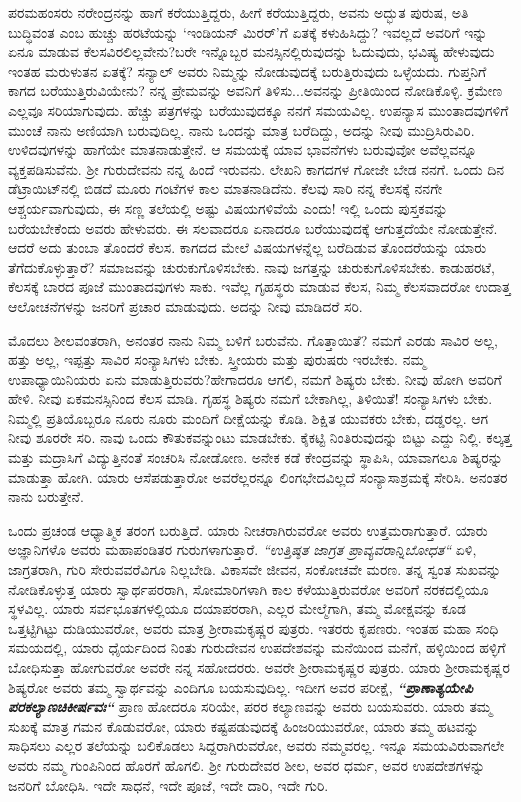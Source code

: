 ಪರಮಹಂಸರು ನರೇಂದ್ರನನ್ನು ಹಾಗೆ ಕರೆಯುತ್ತಿದ್ದರು, ಹೀಗೆ ಕರೆಯುತ್ತಿದ್ದರು, ಅವನು ಅದ್ಭುತ ಪುರುಷ, ಅತಿ ಬುದ್ಧಿವಂತ \enginline{-} ಎಂಬ ಹುಚ್ಚು ಹರಟೆಯನ್ನು ‘ಇಂಡಿಯನ್ ಮಿರರ್’ಗೆ ಏತಕ್ಕೆ ಕಳುಹಿಸಿದ್ದು? ಇವಲ್ಲದೆ ಅವರಿಗೆ ಇನ್ನು ಏನೂ ಮಾಡುವ ಕೆಲಸವಿರಲಿಲ್ಲವೇನು?ಬರೇ ಇನ್ನೊಬ್ಬರ ಮನಸ್ಸಿನಲ್ಲಿರುವುದನ್ನು ಓದುವುದು, ಭವಿಷ್ಯ ಹೇಳುವುದು ಇಂತಹ ಮರುಳುತನ ಏತಕ್ಕೆ? ಸನ್ಯಾಲ್ ಅವರು ನಿಮ್ಮನ್ನು ನೋಡುವುದಕ್ಕೆ ಬರುತ್ತಿರುವುದು ಒಳ್ಳೆಯದು. ಗುಪ್ತನಿಗೆ ಕಾಗದ ಬರೆಯುತ್ತಿರುವಿಯೇನು? ನನ್ನ ಪ್ರೇಮವನ್ನು ಅವನಿಗೆ ತಿಳಿಸು...ಅವನನ್ನು ಪ್ರೀತಿಯಿಂದ ನೋಡಿಕೊಳ್ಳಿ. ಕ್ರಮೇಣ ಎಲ್ಲವೂ ಸರಿಯಾಗುವುದು. ಹೆಚ್ಚು ಪತ್ರಗಳನ್ನು ಬರೆಯುವುದಕ್ಕೂ ನನಗೆ ಸಮಯವಿಲ್ಲ. ಉಪನ್ಯಾಸ ಮುಂತಾದವುಗಳಿಗೆ ಮುಂಚೆ ನಾನು ಅಣಿಯಾಗಿ ಬರುವುದಿಲ್ಲ. ನಾನು ಒಂದನ್ನು ಮಾತ್ರ ಬರೆದಿದ್ದು, ಅದನ್ನು ನೀವು ಮುದ್ರಿಸಿರುವಿರಿ. ಉಳಿದವುಗಳನ್ನು ಹಾಗೆಯೇ ಮಾತನಾಡುತ್ತೇನೆ. ಆ ಸಮಯಕ್ಕೆ ಯಾವ ಭಾವನೆಗಳು ಬರುವುವೋ ಅವೆಲ್ಲವನ್ನೂ ವ್ಯಕ್ತಪಡಿಸುವೆನು. ಶ‍್ರೀ ಗುರುದೇವನು ನನ್ನ ಹಿಂದೆ ಇರುವನು. ಲೇಖನಿ ಕಾಗದಗಳ ಗೋಜೇ ಬೇಡ ನನಗೆ. ಒಂದು ದಿನ ಡೆಟ್ರಾಯಿಟ್‌ನಲ್ಲಿ ಬಿಡದೆ ಮೂರು ಗಂಟೆಗಳ ಕಾಲ ಮಾತನಾಡಿದೆನು. ಕೆಲವು ಸಾರಿ ನನ್ನ ಕೆಲಸಕ್ಕೆ ನನಗೇ ಆಶ್ಚರ್ಯವಾಗುವುದು, ಈ ಸಣ್ಣ ತಲೆಯಲ್ಲಿ ಅಷ್ಟು ವಿಷಯಗಳಿವೆಯೆ ಎಂದು! ಇಲ್ಲಿ ಒಂದು ಪುಸ್ತಕವನ್ನು ಬರೆಯಬೇಕೆಂದು ಅವರು ಹೇಳುವರು. ಈ ಸಲವಾದರೂ ಏನಾದರೂ ಬರೆಯುವುದಕ್ಕೆ ಆಗುತ್ತದೆಯೇ ನೋಡುತ್ತೇನೆ. ಆದರೆ ಅದು ತುಂಬಾ ತೊಂದರೆ ಕೆಲಸ. ಕಾಗದದ ಮೇಲೆ ವಿಷಯಗಳನ್ನೆಲ್ಲ ಬರೆದಿಡುವ ತೊಂದರೆಯನ್ನು ಯಾರು ತೆಗೆದುಕೊಳ್ಳುತ್ತಾರೆ? ಸಮಾಜವನ್ನು ಚುರುಕುಗೊಳಿಸಬೇಕು. ನಾವು ಜಗತ್ತನ್ನು ಚುರುಕುಗೊಳಿಸಬೇಕು. ಕಾಡುಹರಟೆ, ಕೆಲಸಕ್ಕೆ ಬಾರದ ಪೂಜೆ ಮುಂತಾದವುಗಳು ಸಾಕು. ಇವೆಲ್ಲ ಗೃಹಸ್ಥರು ಮಾಡುವ ಕೆಲಸ, ನಿಮ್ಮ ಕೆಲಸವಾದರೋ ಉದಾತ್ತ ಆಲೋಚನೆಗಳನ್ನು ಜನರಿಗೆ ಪ್ರಚಾರ ಮಾಡುವುದು. ಅದನ್ನು ನೀವು ಮಾಡಿದರೆ ಸರಿ.

ಮೊದಲು ಶೀಲವಂತರಾಗಿ, ಅನಂತರ ನಾನು ನಿಮ್ಮ ಬಳಿಗೆ ಬರುವೆನು. ಗೊತ್ತಾಯಿತೆ? ನಮಗೆ ಎರಡು ಸಾವಿರ ಅಲ್ಲ, ಹತ್ತು ಅಲ್ಲ, ಇಪ್ಪತ್ತು ಸಾವಿರ ಸಂನ್ಯಾಸಿಗಳು ಬೇಕು. ಸ್ತ್ರೀಯರು ಮತ್ತು ಪುರುಷರು ಇರಬೇಕು. ನಮ್ಮ ಉಪಾಧ್ಯಾಯಿನಿಯರು ಏನು ಮಾಡುತ್ತಿರುವರು?ಹೇಗಾದರೂ ಆಗಲಿ, ನಮಗೆ ಶಿಷ್ಯರು ಬೇಕು. ನೀವು ಹೋಗಿ ಅವರಿಗೆ ಹೇಳಿ. ನೀವು ಏಕಮನಸ್ಸಿನಿಂದ ಕೆಲಸ ಮಾಡಿ. ಗೃಹಸ್ಥ ಶಿಷ್ಯರು ನಮಗೆ ಬೇಕಾಗಿಲ್ಲ, ತಿಳಿಯಿತೆ! ಸಂನ್ಯಾಸಿಗಳು ಬೇಕು. ನಿಮ್ಮಲ್ಲಿ ಪ್ರತಿಯೊಬ್ಬರೂ ನೂರು ನೂರು ಮಂದಿಗೆ ದೀಕ್ಷೆಯನ್ನು ಕೊಡಿ. ಶಿಕ್ಷಿತ ಯುವಕರು ಬೇಕು, ದಡ್ಡರಲ್ಲ. ಆಗ ನೀವು ಶೂರರೇ ಸರಿ. ನಾವು ಒಂದು ಕೌತುಕವನ್ನುಂಟು ಮಾಡಬೇಕು. ಕೈಕಟ್ಟಿ ನಿಂತಿರುವುದನ್ನು ಬಿಟ್ಟು ಎದ್ದು ನಿಲ್ಲಿ. ಕಲ್ಕತ್ತ ಮತ್ತು ಮದ್ರಾಸಿಗೆ ವಿದ್ಯುತ್ತಿನಂತೆ ಸಂಚರಿಸಿ ನೋಡೋಣ. ಅನೇಕ ಕಡೆ ಕೇಂದ್ರವನ್ನು ಸ್ಥಾಪಿಸಿ, ಯಾವಾಗಲೂ ಶಿಷ್ಯರನ್ನು ಮಾಡುತ್ತಾ ಹೋಗಿ. ಯಾರು ಆಸೆಪಡುತ್ತಾರೋ ಅವರೆಲ್ಲರನ್ನೂ ಲಿಂಗಭೇದವಿಲ್ಲದೆ ಸಂನ್ಯಾಸಾಶ್ರಮಕ್ಕೆ ಸೇರಿಸಿ. ಅನಂತರ ನಾನು ಬರುತ್ತೇನೆ.

ಒಂದು ಪ್ರಚಂಡ ಆಧ್ಯಾತ್ಮಿಕ ತರಂಗ ಬರುತ್ತಿದೆ. ಯಾರು ನೀಚರಾಗಿರುವರೋ ಅವರು ಉತ್ತಮರಾಗುತ್ತಾರೆ. ಯಾರು ಅಜ್ಞಾನಿಗಳೊ ಅವರು ಮಹಾಪಂಡಿತರ ಗುರುಗಳಾಗುತ್ತಾರೆ. \textit{“ಉತ್ತಿಷ್ಠತ ಜಾಗ್ರತ ಪ್ರಾವ್ಯವರಾನ್ನಿಬೋಧತ“} ಏಳಿ, ಜಾಗ್ರತರಾಗಿ, ಗುರಿ ಸೇರುವವರೆವಿಗೂ ನಿಲ್ಲಬೇಡಿ. ವಿಕಾಸವೇ ಜೀವನ, ಸಂಕೋಚವೇ ಮರಣ. ತನ್ನ ಸ್ವಂತ ಸುಖವನ್ನು ನೋಡಿಕೊಳ್ಳುತ್ತ ಯಾರು ಸ್ವಾರ್ಥಪರರಾಗಿ, ಸೋಮಾರಿಗಳಾಗಿ ಕಾಲ ಕಳೆಯುತ್ತಿರುವರೋ ಅವರಿಗೆ ನರಕದಲ್ಲಿಯೂ ಸ್ಥಳವಿಲ್ಲ. ಯಾರು ಸರ್ವಭೂತಗಳಲ್ಲಿಯೂ ದಯಾಪರರಾಗಿ, ಎಲ್ಲರ ಮೇಲ್ಮೆಗಾಗಿ, ತಮ್ಮ ಮೋಕ್ಷವನ್ನು ಕೂಡ ಒತ್ತಟ್ಟಿಗಿಟ್ಟು ದುಡಿಯುವರೋ, ಅವರು ಮಾತ್ರ ಶ‍್ರೀರಾಮಕೃಷ್ಣರ ಪುತ್ರರು. ಇತರರು ಕೃಪಣರು. ಇಂತಹ ಮಹಾ ಸಂಧಿ ಸಮಯದಲ್ಲಿ, ಯಾರು ಧೈರ್ಯದಿಂದ ನಿಂತು ಗುರುದೇವನ ಉಪದೇಶವನ್ನು ಮನೆಯಿಂದ ಮನೆಗೆ, ಹಳ್ಳಿಯಿಂದ ಹಳ್ಳಿಗೆ ಬೋಧಿಸುತ್ತಾ ಹೋಗುವರೋ ಅವರೇ ನನ್ನ ಸಹೋದರರು. ಅವರೇ ಶ‍್ರೀರಾಮಕೃಷ್ಣರ ಪುತ್ರರು. ಯಾರು ಶ‍್ರೀರಾಮಕೃಷ್ಣರ ಶಿಷ್ಯರೋ ಅವರು ತಮ್ಮ ಸ್ವಾರ್ಥವನ್ನು ಎಂದಿಗೂ ಬಯಸುವುದಿಲ್ಲ. ಇದೀಗ ಅವರ ಪರೀಕ್ಷೆ, \textbf{\textit{“ಪ್ರಾಣಾತ್ಯಯೇಪಿ ಪರಕಲ್ಯಾಣಚಿಕೀರ್ಷವಃ“}} ಪ್ರಾಣ ಹೋದರೂ ಸರಿಯೇ, ಪರರ ಕಲ್ಯಾಣವನ್ನು ಅವರು ಬಯಸುವರು. ಯಾರು ತಮ್ಮ ಸುಖಕ್ಕೆ ಮಾತ್ರ ಗಮನ ಕೊಡುವರೋ, ಯಾರು ಕಷ್ಟಪಡುವುದಕ್ಕೆ ಹಿಂಜರಿಯುವರೋ, ಯಾರು ತಮ್ಮ ಹಟವನ್ನು ಸಾಧಿಸಲು ಎಲ್ಲರ ತಲೆಯನ್ನು ಬಲಿಕೊಡಲು ಸಿದ್ದರಾಗಿರುವರೋ, ಅವರು ನಮ್ಮವರಲ್ಲ. ಇನ್ನೂ ಸಮಯವಿರುವಾಗಲೇ ಅವರು ನಮ್ಮ ಗುಂಪಿನಿಂದ ಹೊರಗೆ ಹೊಗಲಿ. ಶ‍್ರೀ ಗುರುದೇವರ ಶೀಲ, ಅವರ ಧರ್ಮ, ಅವರ ಉಪದೇಶಗಳನ್ನು ಜನರಿಗೆ ಬೋಧಿಸಿ. ಇದೇ ಸಾಧನೆ, ಇದೇ ಪೂಜೆ, ಇದೇ ದಾರಿ, ಇದೇ ಗುರಿ.

